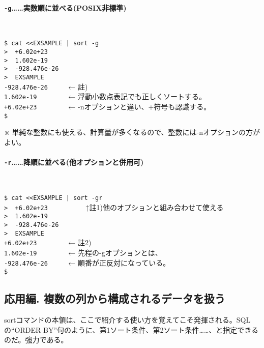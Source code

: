 \paragraph*{\verb|-g|……実数順に並べる(POSIX非標準)}　\\
\begin{screen}
	\verb!$ cat <<EXSAMPLE | sort -g! \return \\
	\verb!>  +6.02e+23! \return \\
	\verb!>  1.602e-19! \return \\
	\verb!>  -928.476e-26! \return \\
	\verb!>  EXSAMPLE! \return \\
	\verb!-928.476e-26     !  ← 註) \\
	\verb!1.602e-19        !  ← 浮動小数点表記でも正しくソートする。 \\
	\verb!+6.02e+23        !  ← -nオプションと違い、+符号も認識する。 \\
	\verb!$ !
\end{screen}

\noindent
※ 単純な整数にも使える、計算量が多くなるので、整数には-nオプションの方がよい。

\paragraph*{\verb|-r|……降順に並べる(他オプションと併用可)}　\\
\begin{screen}
	\verb!$ cat <<EXSAMPLE | sort -gr! \return \\
	\verb!>  +6.02e+23! \return 　　　　　↑註1)他のオプションと組み合わせて使える \\
	\verb!>  1.602e-19! \return \\
	\verb!>  -928.476e-26! \return \\
	\verb!>  EXSAMPLE! \return \\
	\verb!+6.02e+23        !  ← 註2) \\
	\verb!1.602e-19        !  ← 先程の-gオプションとは、 \\
	\verb!-928.476e-26     !  ← 順番が正反対になっている。 \\
	\verb!$ !
\end{screen}

\subsection*{応用編. 複数の列から構成されるデータを扱う}

sortコマンドの本領は、ここで紹介する使い方を覚えてこそ発揮される。SQLの``ORDER BY''句のように、第1ソート条件、第2ソート条件……、と指定できるのだ。強力である。

